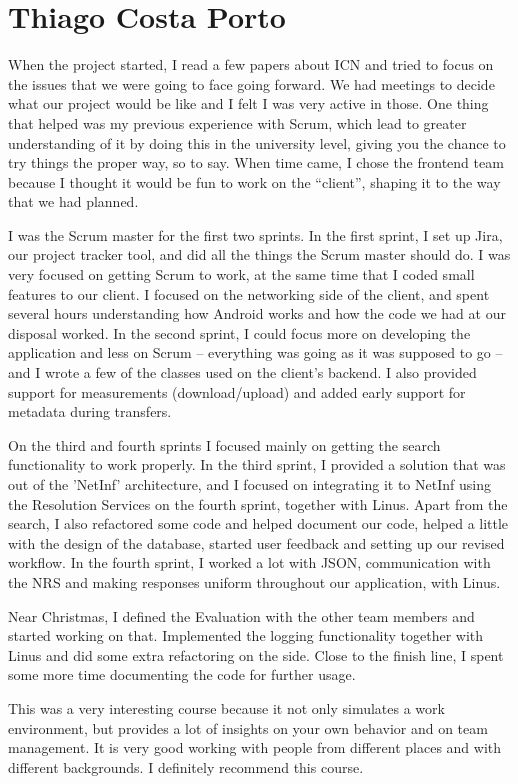 \section{Thiago Costa Porto}
When the project started, I read a few papers about ICN and tried to focus on the issues that we were going to face going forward. We had meetings to decide what our project would be like and I felt I was very active in those. One thing that helped was my previous experience with Scrum, which lead to greater understanding of it by doing this in the university level, giving you the chance to try things the proper way, so to say. When time came, I chose the frontend team because I thought it would be fun to work on the ``client'', shaping it to the way that we had planned.

I was the Scrum master for the first two sprints. In the first sprint, I set up Jira, our project tracker tool, and did all the things the Scrum master should do. I was very focused on getting Scrum to work, at the same time that I coded small features to our client. I focused on the networking side of the client, and spent several hours understanding how Android works and how the code we had at our disposal worked. In the second sprint, I could focus more on developing the application and less on Scrum -- everything was going as it was supposed to go -- and I wrote a few of the classes used on the client's backend. I also provided support for measurements (download/upload) and added early support for metadata during transfers.

On the third and fourth sprints I focused mainly on getting the search functionality to work properly. In the third sprint, I provided a solution that was out of the 'NetInf' architecture, and I focused on integrating it to NetInf using the Resolution Services on the fourth sprint, together with Linus. Apart from the search, I also refactored some code and helped document our code, helped a little with the design of the database, started user feedback and setting up our revised workflow. In the fourth sprint, I worked a lot with JSON, communication with the NRS and making responses uniform throughout our application, with Linus.

Near Christmas, I defined the Evaluation with the other team members and started working on that. Implemented the logging functionality together with Linus and did some extra refactoring on the side. Close to the finish line, I spent some more time documenting the code for further usage.

This was a very interesting course because it not only simulates a work environment, but provides a lot of insights on your own behavior and on team management. It is very good working with people from different places and with different backgrounds. I definitely recommend this course.

